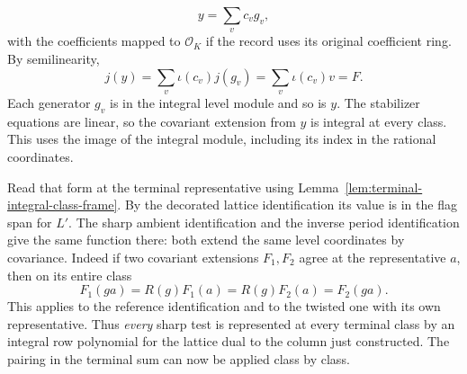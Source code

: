 \[
  y=\sum_v c_vg_v,
\]
 with the coefficients mapped to
\(\mathcal O_K\) if the record uses its original coefficient ring.
By semilinearity,
\[
          j(y)=\sum_v \iota(c_v)j(g_v)
                     =\sum_v\iota(c_v)v=F.
\]
Each generator \(g_v\) is in the integral level module and
so is \(y\). The stabilizer equations are linear, so the
covariant extension from \(y\) is integral at every class.
This uses the image of the integral module, including its
index in the rational coordinates.

Read that form at the terminal representative using
Lemma~\ref{lem:terminal-integral-class-frame}. By the decorated
lattice identification its value is in the flag span for
\(L'\). The sharp ambient identification and the inverse
period identification give the same function there: both
extend the same level coordinates by covariance.
Indeed if two covariant extensions \(F_1,F_2\) agree at the representative \(a\), then on its entire class
\[
  F_1(ga)=R(g)F_1(a)=R(g)F_2(a)=F_2(ga).
\]
 This applies
to the reference identification and to the twisted one with
its own representative. Thus \emph{every} sharp test is
represented at every terminal class by an integral row
polynomial for the lattice dual to the column just
constructed. The pairing in the terminal sum can now be
applied class by class. \label{cor:terminal-realization-4}
